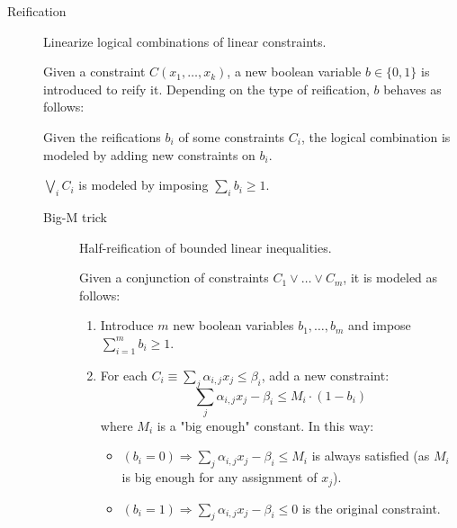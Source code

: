 \begin{description}
    \item[Reification] 
        Linearize logical combinations of linear constraints.

        Given a constraint $C(x_1, \dots, x_k)$, a new boolean variable $b \in \{0, 1\}$ is introduced to reify it.
        Depending on the type of reification, $b$ behaves as follows:

        Given the reifications $b_i$ of some constraints $C_i$, the logical combination is modeled by adding new constraints on $b_i$.
        \begin{example}
            $\bigvee_i C_i$ is modeled by imposing $\sum_{i} b_i \geq 1$.
        \end{example}

        \begin{description}
            \item[Big-M trick] 
                Half-reification of bounded linear inequalities.

                Given a conjunction of constraints $C_1 \vee \dots \vee C_m$, it is modeled as follows:
                \begin{enumerate}
                    \item Introduce $m$ new boolean variables $b_1, \dots, b_m$ and impose $\sum_{i=1}^{m} b_i \geq 1$.
                    \item For each $C_i \equiv \sum_{j} \alpha_{i,j} x_j \leq \beta_i$, add a new constraint:
                        \[ \sum_{j} \alpha_{i,j} x_j - \beta_i \leq M_i \cdot (1-b_i) \]
                        where $M_i$ is a "big enough" constant.
                        In this way:
                        \begin{itemize}
                            \item $(b_i=0) \Rightarrow \sum_{j} \alpha_{i,j} x_j - \beta_i \leq M_i$ is always satisfied (as $M_i$ is big enough for any assignment of $x_j$).
                            \item $(b_i=1) \Rightarrow \sum_{j} \alpha_{i,j} x_j - \beta_i \leq 0$ is the original constraint.
                        \end{itemize}
                \end{enumerate}


\end{description}
\end{description}
